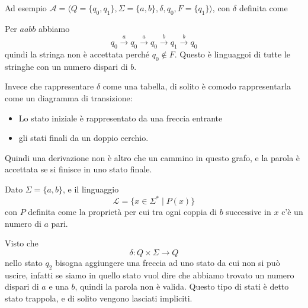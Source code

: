 \documentclass[12pt]{article}
\begin{document}
\begin{tcolorbox}
	Ad esempio $\mathscr{A} = \langle Q = \{ q_0, q_1 \}, \Sigma = \{ a, b \}, \delta, q_0, F = \{ q_1 \} \rangle$, con $\delta$ definita come
	\begin{center}
	\end{center}
	Per $aabb$ abbiamo
	$$ q_0 \overset{a}{\rightarrow} q_0 \overset{a}{\rightarrow} q_0 \overset{b}{\rightarrow} q_1 \overset{b}{\rightarrow} q_0 $$
	quindi la stringa non è accettata perché $q_0 \not \in F$.
	Questo è linguaggoi di tutte le stringhe con un numero dispari di $b$.
\end{tcolorbox}
Invece che rappresentare $\delta$ come una tabella, di solito è comodo rappresentarla come un diagramma di transizione:
\begin{itemize}
	\item Lo stato iniziale è rappresentato da una freccia entrante
	\item gli stati finali da un doppio cerchio.
\end{itemize}
Quindi una derivazione non è altro che un cammino in questo grafo, e la parola è accettata se si finisce in uno stato finale.

\begin{tcolorbox}
	Dato $\Sigma = \{ a, b \}$, e il linguaggio 
	$$ \mathscr{L} = \{ x \in \Sigma^* \mid P(x) \}$$
	con $P$ definita come la proprietà per cui tra ogni coppia di $b$ successive in $x$ c'è un numero di $a$ pari.
	\begin{center}
	\end{center}
	Visto che 
	$$ \delta : Q \times \Sigma \rightarrow Q $$
	nello stato $q_2$ bisogna aggiungere una freccia ad uno stato da cui non si può uscire, infatti se siamo in quello stato vuol dire che abbiamo trovato un numero dispari di $a$ e una $b$, quindi la parola non è valida.
	Questo tipo di stati è detto stato trappola, e di solito vengono lasciati impliciti.
\end{tcolorbox}
\end{document}
